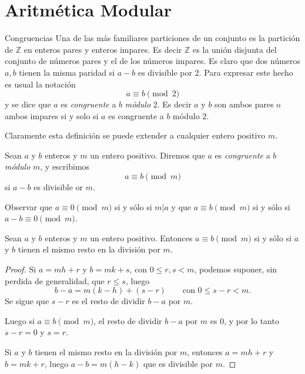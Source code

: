 \chapter[Aritmética Modular]{Aritmética Modular}\label{cap.aritmetica_modular}

\begin{section}{Congruencias}\label{seccion-congruencias}
Una de las más familiares particiones de un conjunto es la partición de $\mathbb Z$ en enteros pares y enteros impares. Es decir $\mathbb Z$ es la unión disjunta del conjunto de números pares y el de los números impares. Es claro que dos números $a,b$ tienen la misma paridad si $a-b$ es divisible por $2$. Para expresar este hecho es usual la notación
$$
a\equiv b \pmod2
$$
y se dice que $a$ es \textit{congruente } a $b$ \textit{módulo} $2$. Es decir $a$ y $b$ son ambos pares o ambos impares si y solo si $a$ es congruente a $b$ módulo $2$.

Claramente esta definición se puede extender a cualquier entero positivo $m$.

\begin{definicion} Sean $a$ y $b$ enteros y $m$ un entero positivo. Diremos que $a$ es {\em congruente} a $b$  {\em módulo} $m$, y escribimos  
$$
a \equiv b \pmod{m}
$$
si $a-b$ es divisible or $m$.
\end{definicion}

Observar que $a\equiv 0 \pmod{m}$ si  y sólo si $m|a$ y que $a\equiv b \pmod{m}$ si y sólo si $a-b\equiv 0 \pmod{m}$. 


\begin{proposicion}
Sean $a$ y $b$ enteros y $m$ un entero positivo. Entonces $a\equiv b \pmod{m}$ si  y sólo si $a$ y $b$ tienen el mismo resto en la división por $m$.
\end{proposicion}
\begin{proof}
Si $a=mh+r$ y $b=mk+s$, con $0 \le r,s <m$, podemos suponer, sin perdida de generalidad, que $r \le s$, luego
$$
b-a= m(k-h) + (s-r) \qquad \text{con $0\le s - r < m$}.
$$
Se sigue que $s-r$ es el resto de dividir $b-a$ por $m$.

Luego si $a\equiv b \pmod{m}$, el resto de dividir   $b-a$ por $m$ es $0$, y por lo tanto $s-r=0$ y $s=r$.

Si $a$ y $b$ tienen el mismo resto en la división por $m$, entonces  $a=mh+r$ y $b=mk+r$, luego $a-b = m(h-k)$ que es divisible por $m$.
\end{proof}


\end{section}
